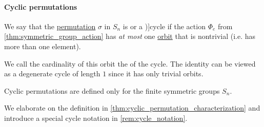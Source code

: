 \paragraph{Cyclic permutations}

\begin{definition}\label{def:cyclic_permutation}
  We say that the \hyperref[def:symmetric_group]{permutation} \( \sigma \) in \( S_n \) is  or a \term[ru=цикл (\cite[sec. 4.3]{Тыртышников2007ЛинейнаяАлгебра})]{cycle} if the action \( \Phi_e \) from \cref{thm:symmetric_group_action} has \emph{at most} one \hyperref[def:group_action_orbit]{orbit} that is nontrivial (i.e. has more than one element).

  We call the cardinality of this orbit the  of the cycle. The identity can be viewed as a degenerate cycle of length \( 1 \) since it has only trivial orbits.
\end{definition}
\begin{comments}
  \item Cyclic permutations are defined only for the finite symmetric groups \( S_n \).
  \item We elaborate on the definition in \cref{thm:cyclic_permutation_characterization} and introduce a special cycle notation in \cref{rem:cycle_notation}.
\end{comments}

